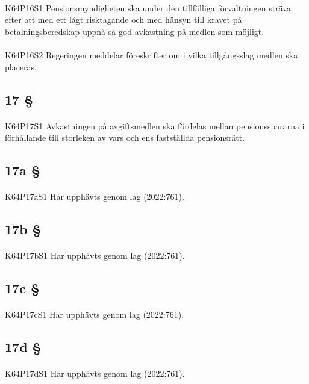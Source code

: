 \documentclass[a4paper,notitlepage,openany,10pt]{book}
\begin{document}
\paragraph*{}
{\tiny K64P16S1}
Pensionsmyndigheten ska under den tillfälliga förvaltningen sträva efter att med ett lågt risktagande och med hänsyn till kravet på betalningsberedskap uppnå så god avkastning på medlen som möjligt.
\paragraph*{}
{\tiny K64P16S2}
Regeringen meddelar föreskrifter om i vilka tillgångsslag medlen ska placeras.
\subsection*{17 §}
\paragraph*{}
{\tiny K64P17S1}
Avkastningen på avgiftsmedlen ska fördelas mellan pensionsspararna i förhållande till storleken av vars och ens fastställda pensionsrätt.
\subsection*{17a §}
\paragraph*{}
{\tiny K64P17aS1}
Har upphävts genom
lag (2022:761).
\subsection*{17b §}
\paragraph*{}
{\tiny K64P17bS1}
Har upphävts genom
lag (2022:761).
\subsection*{17c §}
\paragraph*{}
{\tiny K64P17cS1}
Har upphävts genom
lag (2022:761).
\subsection*{17d §}
\paragraph*{}
{\tiny K64P17dS1}
Har upphävts genom
lag (2022:761).
\end{document}
